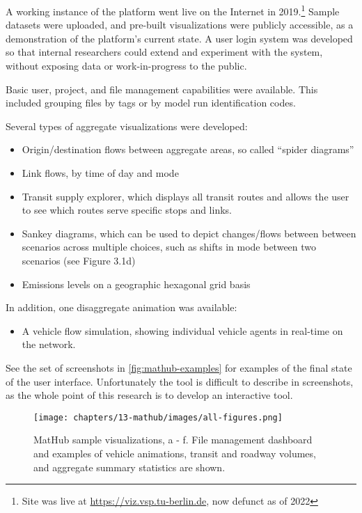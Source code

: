 A working instance of the platform went live on the Internet in 2019.\footnote{Site was live at \url{https://viz.vsp.tu-berlin.de}, now defunct as of 2022} Sample datasets were uploaded, and pre-built visualizations were publicly accessible, as a demonstration of the platform's current state. A user login system was developed so that internal researchers could extend and experiment with the system, without exposing data or work-in-progress to the public.

Basic user, project, and file management capabilities were available. This included grouping files by tags or by model run identification codes.

Several types of aggregate visualizations were developed:

\begin{itemize}
\tightlist
\item
  Origin/destination flows between aggregate areas, so called ``spider
  diagrams''
\item
  Link flows, by time of day and mode
\item
  Transit supply explorer, which displays all transit routes and allows
  the user to see which routes serve specific stops and links.
\item
  Sankey diagrams, which can be used to depict changes/flows between
  between scenarios across multiple choices, such as shifts in mode
  between two scenarios (see Figure 3.1d)
\item
  Emissions levels on a geographic hexagonal grid basis
\end{itemize}

In addition, one disaggregate animation was available:

\begin{itemize}
\tightlist
\item
  A vehicle flow simulation, showing individual vehicle agents in
  real-time on the network.
\end{itemize}

See the set of screenshots in \autoref{fig:mathub-examples} for examples of the final state of the user interface. Unfortunately the tool is difficult to describe in screenshots, as the whole point of this research is to develop an interactive tool.

\begin{figure}
  \centering
	\begin{minipage}{1.0\textwidth}
  \texttt{[image: chapters/13-mathub/images/all-figures.png]}
  \caption{MatHub sample visualizations, a - f. File management dashboard and examples of vehicle animations, transit and roadway volumes, and aggregate summary statistics are shown.}
  \label{fig:mathub-examples}
	\end{minipage}
\end{figure}


